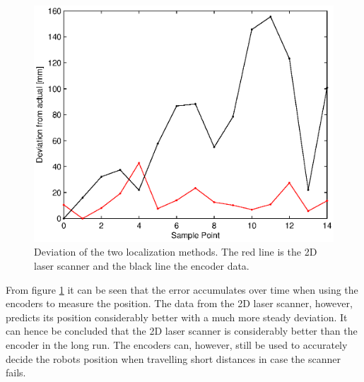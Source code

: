 \begin{figure}[H]
\centering
\includegraphics[width = 13cm]{graphics/deviation_encoderVSscanner}
\caption[Deviation of the two localization methods.]{Deviation of the two localization methods. The red line is the 2D laser scanner and the black line the encoder data.}
\label{fig:deviationOfEncoderVSScanner}
\end{figure}

From figure \ref{fig:deviationOfEncoderVSScanner} it can be seen that the error accumulates over time when using the encoders to measure the position. The data from the 2D laser scanner, however, predicts its position considerably better with a much more steady deviation.
It can hence be concluded that the 2D laser scanner is considerably better than the encoder in the long run. The encoders can, however, still be used to accurately decide the robots position when travelling short distances in case the scanner fails.